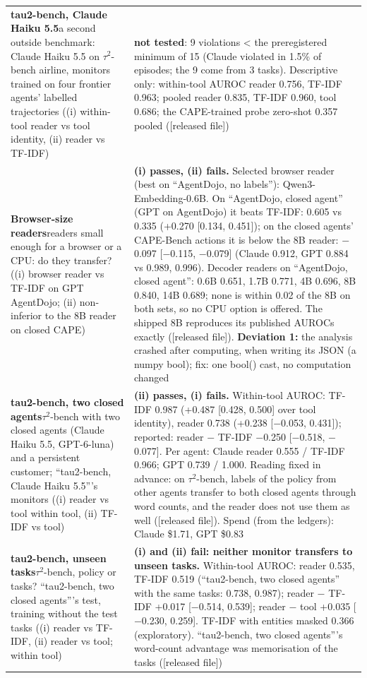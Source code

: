 {\begin{longtable}{p{}p{}}
\textbf{tau2-bench, Claude Haiku 5.5}\newline a second outside benchmark: Claude Haiku 5.5 on $\tau$$^2$-bench airline, monitors trained on four frontier agents' labelled trajectories ((i) within-tool reader vs tool identity, (ii) reader vs TF-IDF) & \textbf{not tested}: 9 violations < the preregistered minimum of 15 (Claude violated in 1.5\% of episodes; the 9 come from 3 tasks). Descriptive only: within-tool AUROC reader 0.756, TF-IDF 0.963; pooled reader 0.835, TF-IDF 0.960, tool 0.686; the CAPE-trained probe zero-shot 0.357 pooled ([released file])\\[2pt]
\textbf{Browser-size readers}\newline readers small enough for a browser or a CPU: do they transfer? ((i) browser reader vs TF-IDF on GPT AgentDojo; (ii) non-inferior to the 8B reader on closed CAPE) & \textbf{(i) passes, (ii) fails.} Selected browser reader (best on ``AgentDojo, no labels''): Qwen3-Embedding-0.6B. On ``AgentDojo, closed agent'' (GPT on AgentDojo) it beats TF-IDF: 0.605 vs 0.335 (+0.270 [0.134, 0.451]); on the closed agents' CAPE-Bench actions it is below the 8B reader: $-$0.097 [$-$0.115, $-$0.079] (Claude 0.912, GPT 0.884 vs 0.989, 0.996). Decoder readers on ``AgentDojo, closed agent'': 0.6B 0.651, 1.7B 0.771, 4B 0.696, 8B 0.840, 14B 0.689; none is within 0.02 of the 8B on both sets, so no CPU option is offered. The shipped 8B reproduces its published AUROCs exactly ([released file]). \textbf{Deviation 1:} the analysis crashed after computing, when writing its JSON (a numpy bool); fix: one bool() cast, no computation changed\\[2pt]
\textbf{tau2-bench, two closed agents}\newline $\tau$$^2$-bench with two closed agents (Claude Haiku 5.5, GPT-6-luna) and a persistent customer; ``tau2-bench, Claude Haiku 5.5'''s monitors ((i) reader vs tool within tool, (ii) TF-IDF vs tool) & \textbf{(ii) passes, (i) fails.} Within-tool AUROC: TF-IDF 0.987 (+0.487 [0.428, 0.500] over tool identity), reader 0.738 (+0.238 [$-$0.053, 0.431]); reported: reader $-$ TF-IDF $-$0.250 [$-$0.518, $-$0.077]. Per agent: Claude reader 0.555 / TF-IDF 0.966; GPT 0.739 / 1.000. Reading fixed in advance: on $\tau$$^2$-bench, labels of the policy from other agents transfer to both closed agents through word counts, and the reader does not use them as well ([released file]). Spend (from the ledgers): Claude \$1.71, GPT \$0.83\\[2pt]
\textbf{tau2-bench, unseen tasks}\newline $\tau$$^2$-bench, policy or tasks? ``tau2-bench, two closed agents'''s test, training without the test tasks ((i) reader vs TF-IDF, (ii) reader vs tool; within tool) & \textbf{(i) and (ii) fail: neither monitor transfers to unseen tasks.} Within-tool AUROC: reader 0.535, TF-IDF 0.519 (``tau2-bench, two closed agents'' with the same tasks: 0.738, 0.987); reader $-$ TF-IDF +0.017 [$-$0.514, 0.539]; reader $-$ tool +0.035 [$-$0.230, 0.259]. TF-IDF with entities masked 0.366 (exploratory). ``tau2-bench, two closed agents'''s word-count advantage was memorisation of the tasks ([released file])\\[2pt]

\end{longtable}}
